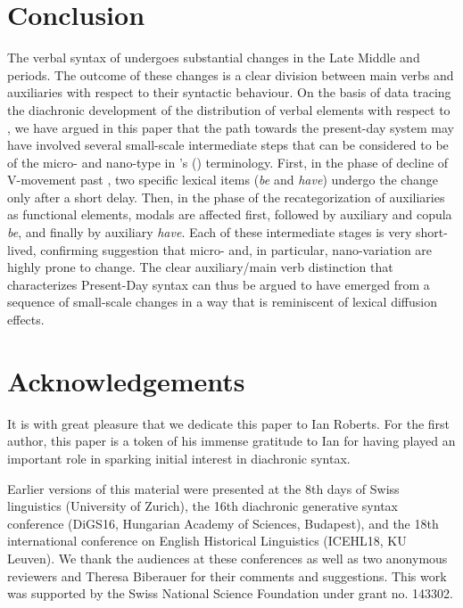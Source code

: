 \documentclass[output=paper]{langsci/langscibook}
\begin{document}
\section{Conclusion}

The verbal syntax of  undergoes substantial changes in the Late Middle
and  periods. The outcome of these changes is a clear
division between main verbs and auxiliaries with respect to their syntactic
behaviour. On the basis of data tracing the diachronic development of the
distribution of verbal elements with respect to , we have argued
in this paper that the path towards the present-day system may have involved
several small-scale intermediate steps that can be considered to be of the
micro- and nano-type in \citeauthor{BibRob2012b}'s
(\citeyear{BibRob2012b,BibRob2016}) terminology. First, in the phase of decline
of V-movement past , two specific lexical items
(\emph{be} and \emph{have}) undergo the change only after a short delay.  Then,
in the phase of the recategorization of auxiliaries as functional elements,
modals are affected first, followed by auxiliary and copula \emph{be},
and finally by auxiliary \emph{have}. Each of these intermediate stages is
very short-lived, confirming  suggestion that micro- and,
in particular, nano-variation are highly prone to change. The clear
auxiliary/main verb distinction that characterizes Present-Day  syntax
can thus be argued to have emerged from a sequence of small-scale changes in a
way that is reminiscent of lexical diffusion effects.

\printchapterglossary{}

\section*{Acknowledgements}

It is with great pleasure that we dedicate this paper to Ian Roberts. For the
first author, this paper is a token of his immense gratitude to Ian for having
played an important role in sparking initial interest in diachronic syntax.

Earlier versions of this material were presented at the 8th days of Swiss
linguistics (University of Zurich), the 16th diachronic generative syntax
conference (DiGS16, Hungarian Academy of Sciences, Budapest), and the 18th
international conference on English Historical Linguistics (ICEHL18, KU
Leuven). We thank the audiences at these conferences as well as two anonymous
reviewers and Theresa Biberauer for their comments and suggestions. This work
was supported by the Swiss National Science Foundation under grant no. 143302.

{\sloppy\printbibliography[heading=subbibliography,notkeyword=this]}
\end{document}
